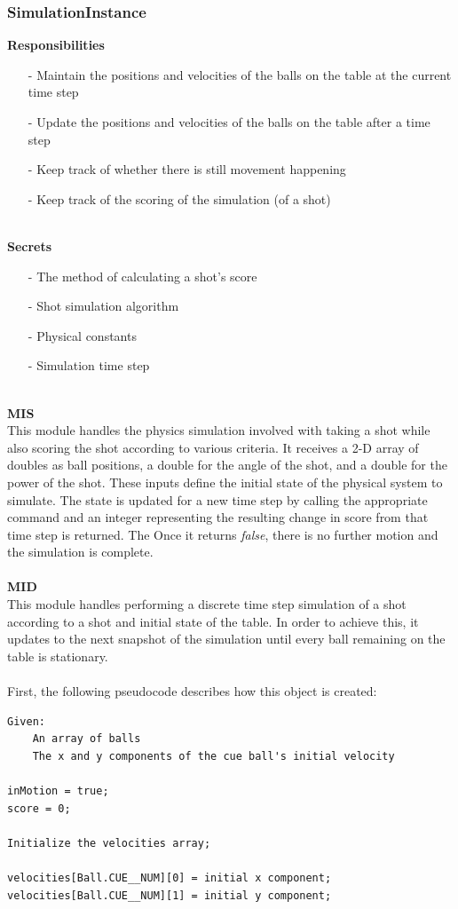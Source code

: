 \documentclass[titlepage]{article}
\begin{document}
\subsubsection{SimulationInstance}
\textbf{Responsibilities}
\begin{itemize}
	\item[-] Maintain the positions and velocities of the balls on the table at the current time step
	\item[-] Update the positions and velocities of the balls on the table after a time step
	\item[-] Keep track of whether there is still movement happening
	\item[-] Keep track of the scoring of the simulation (of a shot)
\end{itemize}~\\
\textbf{Secrets}
\begin{itemize}
	\item[-] The method of calculating a shot's score
	\item[-] Shot simulation algorithm
	\item[-] Physical constants
	\item[-] Simulation time step
\end{itemize}~\\
\textbf{MIS}\\[2mm]
This module handles the physics simulation involved with taking a shot while also scoring the shot according to various criteria. It receives a 2-D array of doubles as ball positions, a double for the angle of the shot, and a double for the power of the shot. These inputs define the initial state of the physical system to simulate. The state is updated for a new time step by calling the appropriate command and an integer representing the resulting change in score from that time step is returned. The Once it returns \textit{false}, there is no further motion and the simulation is complete.
\\\\
\textbf{MID}\\[2mm]
This module handles performing a discrete time step simulation of a shot according to a shot and initial state of the table. In order to achieve this, it updates to the next snapshot of the simulation until every ball remaining on the table is stationary.\\~\\
First, the following pseudocode describes how this object is created:
\begin{lstlisting}
Given:
	An array of balls
	The x and y components of the cue ball's initial velocity
	
inMotion = true;
score = 0;

Initialize the velocities array;

velocities[Ball.CUE__NUM][0] = initial x component;
velocities[Ball.CUE__NUM][1] = initial y component;
\end{lstlisting}~\\\\
\end{document}
